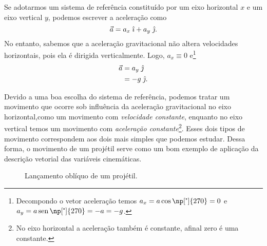 Se adotarmos um sistema de referência constituído por um eixo horizontal $x$ e um eixo vertical $y$, podemos escrever a aceleração como
\begin{equation}
    \vec{a} = a_x \; \hat{\imath} + a_y \; \hat{\jmath}.
\end{equation}
%
No entanto, sabemos que a aceleração gravitacional não altera velocidades horizontais, pois ela é dirigida verticalmente. Logo, $a_x \equiv 0$ e\footnote{Decompondo o vetor aceleração temos $a_x = a \cos\np[\tcdegree]{270} = 0$ e $a_y = a \sen\np[\tcdegree]{270} = -a = -g$.}
\begin{align}
    \vec{a} &= a_y \; \hat{\jmath} \\
    &= -g \; \hat{\jmath}.
\end{align}

Devido a uma boa escolha do sistema de referência, podemos tratar um movimento que ocorre sob influência da aceleração gravitacional no eixo horizontal,como um movimento com \emph{velocidade constante}, enquanto no eixo vertical temos um movimento com \emph{aceleração constante}\footnote{No eixo horizontal a aceleração também é constante, afinal zero é uma constante.}. Esses dois tipos de movimento correspondem aos dois mais simples que podemos estudar. Dessa forma, o movimento de um projétil serve como um bom exemplo de aplicação da descrição vetorial das variáveis cinemáticas.

\begin{figure}[b]
\centering
{}
\caption{Lançamento oblíquo de um projétil.}
\end{figure}

